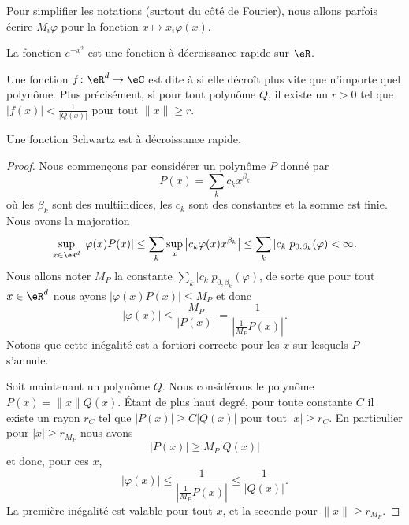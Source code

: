Pour simplifier les notations (surtout du côté de Fourier), nous allons parfois écrire \( M_i\varphi\) pour la fonction \( x\mapsto x_i\varphi(x)\).

\begin{example}
    La fonction \(  e^{-x^2}\) est une fonction à décroissance rapide sur \( \eR\).
\end{example}

\begin{definition}
    Une fonction \( f\colon \eR^d\to \eC\) est dite à  si elle décroît plus vite que n'importe quel polynôme. Plus précisément, si pour tout polynôme \( Q\), il existe un \( r>0\) tel que \(  | f(x) |<\frac{1}{ | Q(x) | } \) pour tout \( \| x \|\geq r\).
\end{definition}

\begin{proposition} \label{PropCSmzwGv}
    Une fonction Schwartz est à décroissance rapide.
\end{proposition}

\begin{proof}
    Nous commençons par considérer un polynôme \( P\) donné par
    \begin{equation}
        P(x)=\sum_kc_kx^{\beta_k}
    \end{equation}
    où les \( \beta_k\) sont des multiindices, les \( c_k\) sont des constantes et la somme est finie. Nous avons la majoration
    \begin{equation}
        \sup_{x\in \eR^d}| \varphi(x)P(x) |\leq\sum_k\sup_x\big| c_k\varphi(x) x^{\beta_k} \big|\leq\sum_k| c_k |p_{0,\beta_k}(\varphi)<\infty.
    \end{equation}
    Nous allons noter \( M_P\) la constante \( \sum_k| c_k |p_{0,\beta_k}(\varphi)\), de sorte que pour tout \( x\in \eR^d\) nous ayons \( | \varphi(x)P(x) |\leq M_P\) et donc
    \begin{equation}
        | \varphi(x) |\leq \frac{ M_P }{ | P(x) | }=\frac{1}{ | \frac{1}{ M_P }P(x) | }.
    \end{equation}
    Notons que cette inégalité est a fortiori correcte pour les \( x\) sur lesquels \( P\) s'annule.

    Soit maintenant un polynôme \( Q\). Nous considérons le polynôme \( P(x)=\| x \|Q(x)\). Étant de plus haut degré, pour toute constante \( C\) il existe un rayon \( r_C\) tel que \( | P(x) |\geq C| Q(x) |\) pour tout \( | x |\geq r_C\). En particulier pour \( | x |\geq r_{M_P}\) nous avons
    \begin{equation}
        | P(x) |\geq M_P| Q(x) |
    \end{equation}
    et donc, pour ces \( x\), 
    \begin{equation}
        | \varphi(x) |\leq \frac{1}{ | \frac{1}{ M_P }P(x) | }\leq \frac{1}{ | Q(x) | }.
    \end{equation}
    La première inégalité est valable pour tout \( x\), et la seconde pour \( \| x \|\geq r_{M_P}\).
\end{proof}

